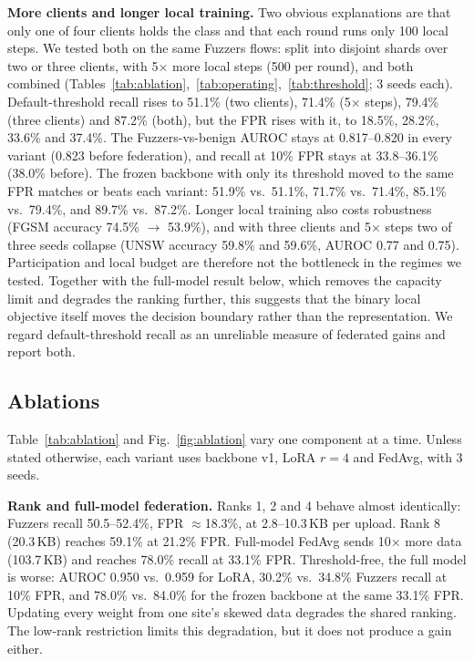 \textbf{More clients and longer local training.} Two obvious explanations
are that only one of four clients holds the class and that each round runs
only 100 local steps. We tested both on the same Fuzzers flows: split into
disjoint shards over two or three clients, with 5$\times$ more local steps
(500 per round), and both combined (Tables~\ref{tab:ablation},~\ref{tab:operating},~\ref{tab:threshold};
3 seeds each). Default-threshold recall rises to 51.1\% (two clients),
71.4\% (5$\times$ steps), 79.4\% (three clients) and 87.2\% (both), but the
FPR rises with it, to 18.5\%, 28.2\%, 33.6\% and 37.4\%. The Fuzzers-vs-benign
AUROC stays at 0.817--0.820 in every variant (0.823 before federation), and
recall at 10\% FPR stays at 33.8--36.1\% (38.0\% before). The frozen backbone
with only its threshold moved to the same FPR matches or beats each variant:
51.9\% vs.\ 51.1\%, 71.7\% vs.\ 71.4\%, 85.1\% vs.\ 79.4\%, and 89.7\% vs.\
87.2\%. Longer local training also costs robustness (FGSM accuracy 74.5\%
$\rightarrow$ 53.9\%), and with three clients and 5$\times$ steps two of three
seeds collapse (UNSW accuracy 59.8\% and 59.6\%, AUROC 0.77 and 0.75).
Participation and local budget are therefore not the bottleneck in the regimes
we tested. Together with the full-model result below, which removes the
capacity limit and degrades the ranking further, this suggests that the
binary local objective itself moves the decision boundary rather than the
representation. We regard default-threshold recall as an unreliable measure
of federated gains and report both.

\subsection{Ablations}
Table~\ref{tab:ablation} and Fig.~\ref{fig:ablation} vary one component at a
time. Unless stated otherwise, each variant uses backbone v1, LoRA $r{=}4$ and
FedAvg, with 3 seeds.

\textbf{Rank and full-model federation.} Ranks 1, 2 and 4 behave almost
identically: Fuzzers recall 50.5--52.4\%, FPR $\approx$18.3\%, at 2.8--10.3\,KB
per upload. Rank 8 (20.3\,KB) reaches 59.1\% at 21.2\% FPR. Full-model FedAvg
sends 10$\times$ more data (103.7\,KB) and reaches 78.0\% recall at 33.1\% FPR.
Threshold-free, the full model is worse: AUROC 0.950 vs.\ 0.959 for LoRA,
30.2\% vs.\ 34.8\% Fuzzers recall at 10\% FPR, and 78.0\% vs.\ 84.0\% for the
frozen backbone at the same 33.1\% FPR. Updating every weight from one
site's skewed data degrades the shared ranking. The low-rank restriction
limits this degradation, but it does not produce a gain either.

